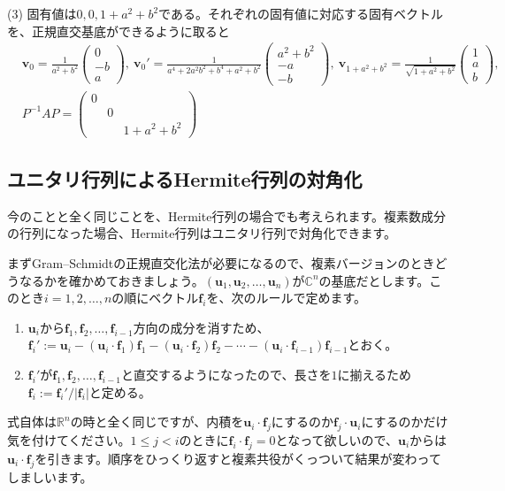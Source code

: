 \noindent (3) 固有値は$0, 0, 1 + a^2 + b^2$である。それぞれの固有値に対応する固有ベクトルを、正規直交基底ができるように取ると
\begin{align*}
& \bm{v}_{0} =
\frac{1}{a^2 + b^2}
\begin{pmatrix}
0 \\
-b \\
a
\end{pmatrix}, \ 
\bm{v}_{0}' =
\frac{1}{a^4 + 2a^2 b^2 + b^4 + a^2 + b^2}
\begin{pmatrix}
a^2 + b^2 \\
-a \\
-b
\end{pmatrix}, \ 
\bm{v}_{1 + a^2 + b^2} =
\frac{1}{\sqrt{1 + a^2 + b^2}}
\begin{pmatrix}
1 \\
a \\
b
\end{pmatrix}, \\
& P^{-1} A P 
= 
\begin{pmatrix}
0 \\
& 0 \\
& & 1 + a^2 + b^2
\end{pmatrix}
\end{align*}

\subsection{ユニタリ行列によるHermite行列の対角化}

今のことと全く同じことを、Hermite行列の場合でも考えられます。複素数成分の行列になった場合、Hermite行列はユニタリ行列で対角化できます。

まずGram--Schmidtの正規直交化法が必要になるので、複素バージョンのときどうなるかを確かめておきましょう。$(\bm{u}_1, \bm{u}_2, \ldots, \bm{u}_n)$が$\mathbb{C}^n$の基底だとします。このとき$i = 1, 2, \ldots, n$の順にベクトル$\bm{f}_i$を、次のルールで定めます。
\begin{enumerate}
\item $\bm{u}_i$から$\bm{f}_1, \bm{f}_2, \ldots, \bm{f}_{i - 1}$方向の成分を消すため、$\bm{f}_i' := \bm{u}_i - (\bm{u}_i \cdot \bm{f}_1) \bm{f}_1 - (\bm{u}_i \cdot \bm{f}_2) \bm{f}_2 - \cdots - (\bm{u}_i \cdot \bm{f}_{i - 1}) \bm{f}_{i - 1}$とおく。
\item $\bm{f}_i'$が$\bm{f}_1, \bm{f}_2, \ldots, \bm{f}_{i - 1}$と直交するようになったので、長さを$1$に揃えるため$\bm{f}_i := \bm{f}_i' / |\bm{f}_i|$と定める。
\end{enumerate}
式自体は$\mathbb{R}^n$の時と全く同じですが、内積を$\bm{u}_i \cdot \bm{f}_j$にするのか$\bm{f}_j \cdot \bm{u}_i$にするのかだけ気を付けてください。$1 \leq j < i$のときに$\bm{f}_i \cdot \bm{f}_j = 0$となって欲しいので、$\bm{u}_i$からは$\bm{u}_i \cdot \bm{f}_j$を引きます。順序をひっくり返すと複素共役がくっついて結果が変わってしましいます。

